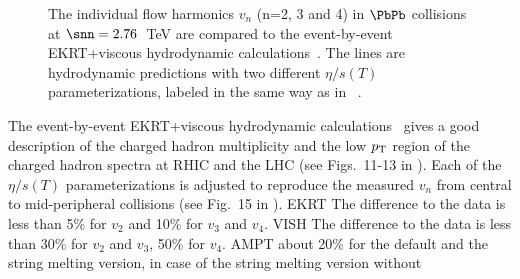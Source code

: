\begin{figure}[h]
\begin{center}
        \caption{The individual flow harmonics $v_n$ (n=2, 3 and 4) in $\PbPb$ collisions at $\snn=2.76$~TeV are compared to the event-by-event EKRT+viscous hydrodynamic calculations~\cite{Niemi:2015qia}. The lines are hydrodynamic predictions with two different $\eta/s(T)$ parameterizations, labeled in the same way as in ~\cite{Niemi:2015qia}.}
        \label{fig:Figure_8}
              \end{center}
\end{figure}
The event-by-event EKRT+viscous hydrodynamic calculations~\cite{Niemi:2015qia} gives a good description of the charged hadron multiplicity and the low $p_{\rm T}$ region of the charged hadron spectra at RHIC and the LHC (see Figs.~11-13 in \cite{Niemi:2015qia}).
Each of the $\eta/s(T)$ parameterizations is adjusted to reproduce the measured $v_n$ from central to mid-peripheral collisions (see Fig.~15 in \cite{Niemi:2015qia}). 
EKRT The difference to the data is less than 5\% for $v_2$ and 10\% for $v_3$ and $v_4$.
VISH The difference to the data is less than 30\% for $v_2$ and $v_3$,  50\% for $v_4$.
AMPT about 20\% for the default and the string melting version, in case of the string melting version without 

